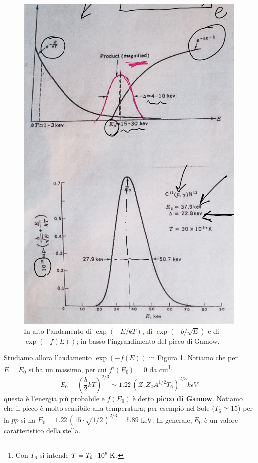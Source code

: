 \begin{figure}
    \centering
    \includegraphics[scale=0.2]{Immagini/0324_gamow2.png}
    \caption{In alto l'andamento di $\exp{(-E/kT)}$, di $\exp{(-b/\sqrt{E})}$ e di $\exp{(-f(E))}$; in basso l'ingrandimento del picco di Gamow.}
    \label{0324_picco}
\end{figure}
\noindent Studiamo allora l'andamento $\exp{(-f(E))}$ in Figura \ref{0324_picco}. Notiamo che per $E=E_0$ si ha un massimo, per cui $f'(E_0) = 0$ da cui\footnote{Con $T_6$ si intende $T = T_6 \cdot 10^{6}\;\mbox{K}$.}: 
$$E_0 = (\frac{b}{2}kT)^{2/3} \simeq 1.22 \, (Z_1Z_2 A^{1/2} T_6)^{2/3}\unit{keV} $$
questa è l'energia più probabile e $f(E_0)$ è detto \textbf{picco di Gamow}. Notiamo che il picco è molto sensibile alla temperatura; per esempio nel Sole ($T_6\simeq 15$) per la $pp$ si ha $E_0 = 1.22\, (15\cdot \sqrt{1/2})^{2/3} = 5.89$ keV. In generale, $E_0$ è un valore caratteristico della stella.\\
